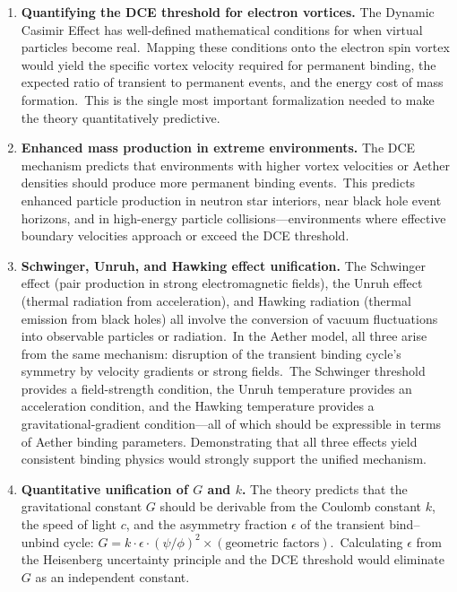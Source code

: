 ﻿\documentclass[12pt,letterpaper]{article}
\begin{document}
\begin{enumerate}[leftmargin=2em]
  \item \textbf{Quantifying the DCE threshold for electron vortices.} The Dynamic Casimir Effect has
    well-defined mathematical conditions for when virtual particles become real.\ Mapping
    these conditions onto the electron spin vortex would yield the specific vortex velocity
    required for permanent binding, the expected ratio of transient to permanent events,
    and the energy cost of mass formation.\ This is the single most important formalization
    needed to make the theory quantitatively predictive.

  \item \textbf{Enhanced mass production in extreme environments.} The DCE mechanism predicts that
    environments with higher vortex velocities or Aether densities should produce more
    permanent binding events.\ This predicts enhanced particle production in neutron star
    interiors, near black hole event horizons, and in high-energy particle collisions---environments where effective boundary velocities approach or exceed the DCE threshold.

  \item \textbf{Schwinger, Unruh, and Hawking effect unification.} The Schwinger effect (pair
    production in strong electromagnetic fields), the Unruh effect (thermal radiation from
    acceleration), and Hawking radiation (thermal emission from black holes) all involve
    the conversion of vacuum fluctuations into observable particles or radiation.\ In the
    Aether model, all three arise from the same mechanism: disruption of the transient
    binding cycle's symmetry by velocity gradients or strong fields.\ The Schwinger
    threshold provides a field-strength condition, the Unruh temperature provides an
    acceleration condition, and the Hawking temperature provides a gravitational-gradient
    condition---all of which should be expressible in terms of Aether binding parameters.
    Demonstrating that all three effects yield consistent binding physics would strongly
    support the unified mechanism.

  \item \textbf{Quantitative unification of $G$ and $k$.} The theory predicts that the gravitational
    constant $G$ should be derivable from the Coulomb constant $k$, the speed of light $c$,
    and the asymmetry fraction $\epsilon$ of the transient bind--unbind cycle:
    $G = k \cdot \epsilon \cdot (\psi/\phi)^2 \times (\text{geometric factors})$.\ Calculating
    $\epsilon$ from the Heisenberg uncertainty principle and the DCE threshold would
    eliminate $G$ as an independent constant.


\end{enumerate}
\end{document}
